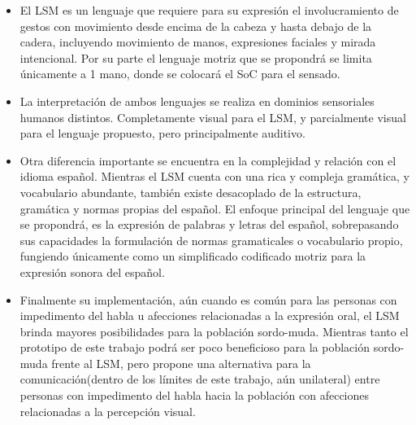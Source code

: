 \begin{itemize}
	\item El LSM es un lenguaje que requiere para su expresión el involucramiento de gestos con movimiento desde encima de la cabeza y hasta debajo de la cadera, incluyendo movimiento de manos, expresiones faciales y mirada intencional. Por su parte el lenguaje motriz que se propondrá se limita únicamente a 1 mano, donde se colocará el SoC para el sensado.
	
	\item La interpretación de ambos lenguajes se realiza en dominios sensoriales humanos distintos. Completamente visual para el LSM, y parcialmente visual para el lenguaje propuesto, pero principalmente auditivo.
	
	\item Otra diferencia importante se encuentra en la complejidad y relación con el idioma español. Mientras el LSM cuenta con una rica y compleja gramática, y vocabulario abundante, también existe desacoplado de la estructura, gramática y normas propias del español. El enfoque principal del lenguaje que se propondrá, es la expresión de palabras y letras del español, sobrepasando sus capacidades la formulación de normas gramaticales o vocabulario propio, fungiendo únicamente como un simplificado codificado motriz para la expresión sonora del español.
	
	\item Finalmente su implementación, aún cuando es común para las personas con impedimento del habla u afecciones relacionadas a la expresión oral, el LSM brinda mayores posibilidades para la población sordo-muda. Mientras tanto el prototipo de este trabajo podrá ser poco beneficioso para la población sordo-muda frente al LSM, pero propone una alternativa para la comunicación(dentro de los límites de este trabajo, aún unilateral) entre personas con impedimento del habla hacia la población con afecciones relacionadas a la percepción visual.
\end{itemize}






